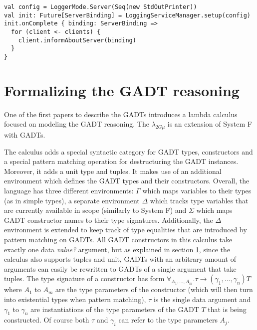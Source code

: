 \begin{verbatim}
val config = LoggerMode.Server(Seq(new StdOutPrinter))
val init: Future[ServerBinding] = LoggingServiceManager.setup(config)
init.onComplete { binding: ServerBinding =>
  for (client <- clients) {
    client.informAboutServer(binding)
  }
}
\end{verbatim}

\section{Formalizing the GADT reasoning}

One of the first papers to describe the GADTs \cite{XiGRDT} introduces a lambda calculus focused on modeling the GADT reasoning. The $\lambda_{2G\mu}$ is an extension of System F with GADTs.

The calculus adds a special syntactic category for GADT types, constructors and a special pattern matching operation for destructuring the GADT instances. Moreover, it adds a unit type and tuples. It makes use of an additional environment which defines the GADT types and their constructors. Overall, the language has three different environments: $\Gamma$ which maps variables to their types (as in simple types), a separate environment $\Delta$ which tracks type variables that are currently available in scope (similarly to System F) and $\Sigma$ which maps GADT constructor names to their type signatures. Additionally, the $\Delta$ environment is extended to keep track of type equalities that are introduced by pattern matching on GADTs. All GADT constructors in this calculus take exactly one data \textit{value?} argument, but as explained in section \ref{}, since the calculus also supports tuples and unit, GADTs with an arbitrary amount of arguments can easily be rewritten to GADTs of a single argument that take tuples. The type signature of a constructor has form $\forall_{A_1, ..., A_m}. \tau \to (\gamma_1, ..., \gamma_n) T$ where $A_1$ to $A_m$ are the type parameters of the constructor (which will then turn into existential types when pattern matching), $\tau$ is the single data argument and $\gamma_1$ to $\gamma_n$ are instantiations of the type parameters of the GADT $T$ that is being constructed. Of course both $\tau$ and $\gamma_i$ can refer to the type parameters $A_j$.



